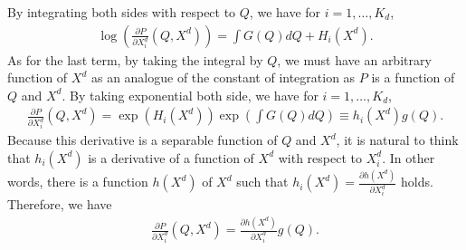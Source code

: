 \documentclass[11pt, a4paper]{article}
\theoremstyle{remark}
\begin{document}
By integrating both sides with respect to $Q$, we have for $i = 1, \ldots, K_d$,
\begin{align}
    \log \left(\frac{\partial P}{\partial X^{d}_i}(Q, X^{d})\right) = \int G(Q) dQ + H_i(X^{d}).
\end{align}
As for the last term, by taking the integral by $Q$, we must have an arbitrary function of $X^{d}$ as an analogue of the constant of integration as $P$ is a function of $Q$ and $X^{d}$.
By taking exponential both side, we have for $i = 1, \ldots, K_d$,
\begin{align}
    \frac{\partial P}{\partial X^{d}_i}(Q, X^{d}) = \exp(H_i(X^{d})) \exp\left(\int G(Q) dQ\right) \equiv h_i(X^{d}) g(Q).
\end{align}
Because this derivative is a separable function of $Q$ and $X^{d}$, it is natural to think that $h_i(X^{d})$ is a derivative of a function of $X^{d}$ with respect to $X^{d}_i$.
In other words, there is a function $h(X^{d})$ of $X^{d}$ such that $h_i(X^{d}) = \frac{\partial h(X^{d})}{\partial X^{d}_i}$ holds.
Therefore, we have
\begin{align}
    \frac{\partial P}{\partial X^{d}_i}(Q, X^{d}) = \frac{\partial h(X^{d})}{\partial X^{d}_i} g(Q).
\end{align}
\end{document}
